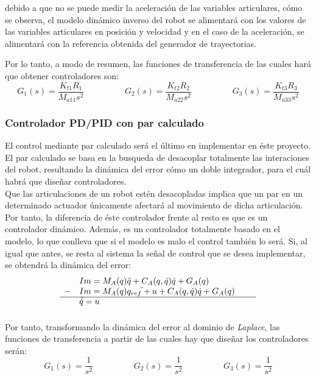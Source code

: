 debido a que no se puede medir la aceleración de las variables articulares, cómo se observa, el modelo dinámico inverso del robot se alimentará con los valores de las variables articulares en posición y velocidad y en el caso de la aceleración, se alimentará con la referencia obtenida del generador de trayectorias.

Por lo tanto, a modo de resumen, las funciones de transferencia de las cuales hará que obtener controladores son:
\begin{equation}
	G_{1}(s)=\frac{K_{t1}R_1}{M_{a11}s^{2}} \hspace{2cm} G_{2}(s)=\frac{K_{t2}R_2}{M_{a22}s^{2}} \hspace{2cm} G_{3}(s)=\frac{K_{t3}R_3}{M_{a33}s^{2}}
\end{equation}


	\subsubsection{Controlador PD/PID con par calculado}
	El control mediante par calculado será el último en implementar en éste proyecto. El par calculado se basa en la busqueda de desacoplar totalmente las interaciones del robot, resultando la dinámica del error cómo un doble integrador, para el cuál habrá que diseñar controladores. \\
	Que las articulaciones de un robot estén desacopladas implica que un par en un determinado actuador únicamente afectará al movimiento de dicha articulación.\\
	Por tanto, la diferencia de éste controlador frente al resto es que es un controlador dinámico. Además, es un controlador totalmente basado en el modelo, lo que conlleva que si el modelo es malo el control también lo será.
	Si, al igual que antes, se resta al sistema la señal de control que se desea implementar, se obtendrá la dinámica del error:
	\begin{equation}
		\begin{array}{llll}
		  & Im=M_{A}(q)\ddot{q} + C_{A}(q,\dot{q})\dot{q} + G_{A}(q) \\
		- & Im=M_{A}(q)\ddot{q_{ref}+u} + C_{A}(q,\dot{q})\dot{q} + G_{A}(q) \\
		\cline{1-4}
		\vspace{0.2cm}
		  & \tilde{\ddot{q}} = u & &
		\end{array}
	\end{equation}

	Por tanto, transformando la dinámica del error al dominio de \textit{Laplace}, las funciones de transferencia a partir de las cuales hay que diseñar los controladores serán:
	\begin{equation}
		G_{1}(s)=\frac{1}{s^{2}} \hspace{2cm} G_{2}(s)=\frac{1}{s^{2}} \hspace{2cm} G_{3}(s)=\frac{1}{s^{2}}
	\end{equation}

